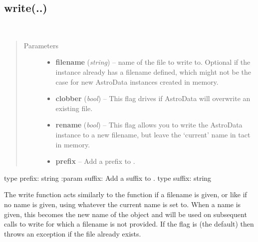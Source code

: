 \documentclass[letterpaper,10pt,english]{sphinxmanual}
\begin{document}
\subsection{write(..)}
\label{chapter_AstroDataClass:write}

\begin{fulllineitems}
\label{chapter_AstroDataClass:astrodata.data.AstroData.write}~\begin{quote}\begin{description}
\item[{Parameters}] \leavevmode\begin{itemize}
\item {} 
\textbf{filename} (\emph{string}) -- name of the file to write to. Optional if the instance
already has a filename defined, which might not be the case for new AstroData
instances created in memory.

\item {} 
\textbf{clobber} (\emph{bool}) -- This flag drives if AstroData will overwrite an existing
file.

\item {} 
\textbf{rename} (\emph{bool}) -- This flag allows you to write the AstroData instance to
a new filename, but leave the `current' name in tact in memory.

\item {} 
\textbf{prefix} -- Add a prefix to .

\end{itemize}

\end{description}\end{quote}

type prefix: string
:param suffix: Add a suffix to .
type suffix: string

The write function acts similarly to the 
function if a filename is given, or like  if 
no name is given, using whatever the current name is set to. When a name
is given, this becomes the new name of the  object and
will be used on subsequent calls to  write for which a filename is not
provided. If the  flag is  (the default) then 
throws an exception if the file already exists.

\end{fulllineitems}
\end{document}

